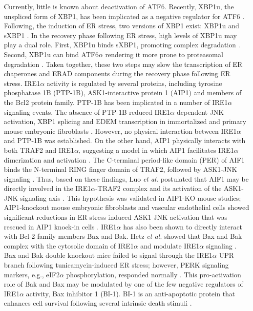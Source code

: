 \documentclass[fleqn,10pt]{wlscirep}
\begin{document}
Currently, little is known about deactivation of ATF6. Recently, XBP1u, the unspliced form of XBP1, has been implicated as a negative regulator for ATF6 \cite{Yoshida:2009bs}. Following, the induction of ER stress, two versions of XBP1 exist: XBP1u and sXBP1 \cite{Yoshida:2009bs}.
In the recovery phase following ER stress, high levels of XBP1u may play a dual role. First, XBP1u binds sXBP1, promoting complex degradation \cite{Yoshida:2006dz, Tirosh:2006fv}.
Second, XBP1u can bind ATF6$\alpha$ rendering it more prone to proteasomal degradation \cite{Yoshida:2009bs}.
Taken together, these two steps may slow the transcription of ER chaperones and ERAD components during the recovery phase following ER stress. IRE1$\alpha$ activity is regulated by several proteins, including tyrosine phosphatase 1B (PTP-1B), ASK1-interactive protein 1 (AIP1) and members of the Bcl2 protein family.
PTP-1B has been implicated in a number of IRE1$\alpha$ signaling events. The absence of PTP-1B reduced IRE1$\alpha$ dependent JNK activation, XBP1 splicing and EDEM transcription in immortalized and primary mouse embryonic fibroblasts \cite{Gu:2004kx}.
However, no physical interaction between IRE1$\alpha$ and PTP-1B was established. On the other hand, AIP1 physically interacts with both TRAF2 and IRE1$\alpha$, suggesting a model in which AIP1 facilitates IRE1$\alpha$ dimerization and activation \cite{Luo:2008ly}.
The C-terminal period-like domain (PER) of AIF1 binds the N-terminal RING finger domain of TRAF2, followed by ASK1-JNK signaling \cite{Zhang:2004ve}.
Thus, based on these findings, Luo \emph{et al.} postulated that AIF1 may be directly involved in the IRE1$\alpha$-TRAF2 complex and its activation of the ASK1-JNK signaling axis \cite{Luo:2008ly}.
This hypothesis was validated in AIP1-KO mouse studies; AIP1-knockout mouse embryonic fibroblasts and vascular endothelial cells showed significant reductions in ER-stress induced ASK1-JNK activation that was rescued in AIP1 knock-in cells \cite{Luo:2008ly}.
IRE1$\alpha$ has also been shown to directly interact with Bcl-2 family members Bax and Bak. Hetz \emph{et al.} showed that Bax and Bak complex with the cytosolic domain of IRE1$\alpha$ and modulate IRE1$\alpha$ signaling \cite{Hetz:2006qf}.
Bax and Bak double knockout mice failed to signal through the IRE1$\alpha$ UPR branch following tunicamycin-induced ER stress; however, PERK signaling markers, e.g., eIF2$\alpha$ phosphorylation, responded normally \cite{Hetz:2006qf}.
This pro-activation role of Bak and Bax may be modulated by one of the few negative regulators of IRE1$\alpha$ activity, Bax inhibitor 1 (BI-1). BI-1 is an anti-apoptotic protein that enhances cell survival following several intrinsic death stimuli \cite{Xu:1998dq}.
\end{document}
